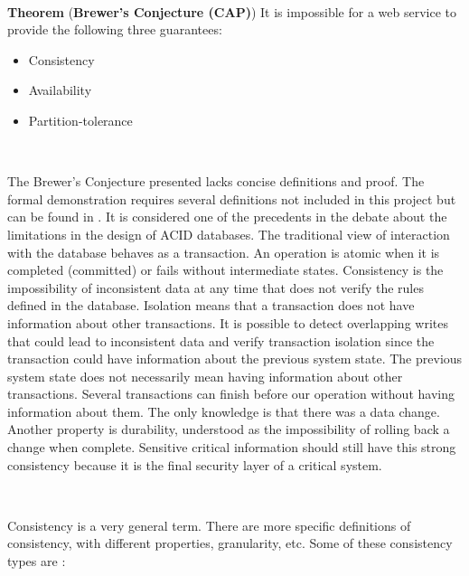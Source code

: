 \documentclass[12pt,english]{article} %
\newcounter{theoremcounter}
\newcommand*{\theorem}[2]{\textbf{Theorem \thetheoremcounter\refstepcounter{theoremcounter}} (\textbf{#1})
\newline
#2}
\begin{document}
\

\theorem{Brewer's Conjecture (CAP)}{It is impossible for a web service to provide the following three guarantees:
\begin{itemize}
    \item Consistency
    \item Availability
    \item Partition-tolerance
\end{itemize}}

\

The Brewer's Conjecture presented lacks concise definitions and proof.
The formal demonstration requires several definitions not included in this project but can be found in \cite{brewer-conjecture-cap}.
It is considered one of the precedents in the debate about the limitations in the design of ACID databases.
The traditional view of interaction with the database behaves as a transaction.
An operation is atomic when it is completed (committed) or fails without intermediate states.
Consistency is the impossibility of inconsistent data at any time that does not verify the rules defined in the database.
Isolation means that a transaction does not have information about other transactions.
It is possible to detect overlapping writes that could lead to inconsistent data and verify transaction isolation since the transaction could have information about the previous system state.
The previous system state does not necessarily mean having information about other transactions.
Several transactions can finish before our operation without having information about them.
The only knowledge is that there was a data change.
Another property is durability, understood as the impossibility of rolling back a change when complete.
Sensitive critical information should still have this strong consistency because it is the final security layer of a critical system.

\





Consistency is a very general term.
There are more specific definitions of consistency, with different properties, granularity, etc.
Some of these consistency types are \cite{acid-base-database-transaction-processing}:
\end{document}
